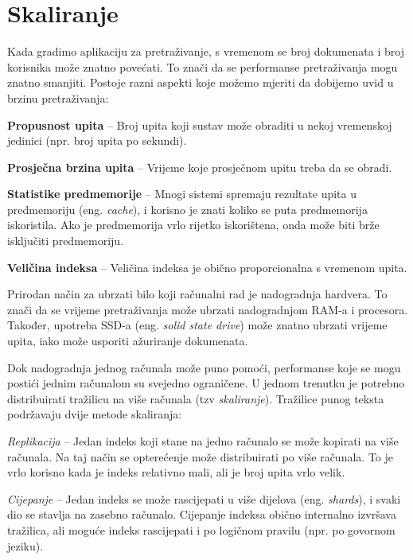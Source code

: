 \documentclass[a4paper,twoside,12pt]{scrreprt}
\begin{document}
\section{Skaliranje}

Kada gradimo aplikaciju za pretraživanje, s vremenom se broj dokumenata i broj korisnika može znatno povećati. To znači da se performanse pretraživanja mogu znatno smanjiti. Postoje razni aspekti koje možemo mjeriti da dobijemo uvid u brzinu pretraživanja:

\begin{compactitem}
  \item \textbf{Propusnost upita} – Broj upita koji sustav može obraditi u nekoj vremenskoj jedinici (npr. broj upita po sekundi).
  \item \textbf{Prosječna brzina upita} – Vrijeme koje prosječnom upitu treba da se obradi.
  \item \textbf{Statistike predmemorije} – Mnogi sistemi spremaju rezultate upita u predmemoriju (eng. \textit{cache}), i korisno je znati koliko se puta predmemorija iskoristila. Ako je predmemorija vrlo rijetko iskorištena, onda može biti brže isključiti predmemoriju.
  \item \textbf{Veličina indeksa} – Veličina indeksa je obično proporcionalna s vremenom upita.
\end{compactitem}

Prirodan način za ubrzati bilo koji računalni rad je nadogradnja hardvera. To znači da se vrijeme pretraživanja može ubrzati nadogradnjom RAM-a i procesora. Također, upotreba SSD-a (eng. \textit{solid state drive}) može znatno ubrzati vrijeme upita, iako može usporiti ažuriranje dokumenata.

Dok nadogradnja jednog računala može puno pomoći, performanse koje se mogu postići jednim računalom su svejedno ograničene. U jednom trenutku je potrebno distribuirati tražilicu na više računala (tzv \textit{skaliranje}). Tražilice punog teksta podržavaju dvije metode skaliranja:

\begin{compactenum}
  \item \textit{Replikacija} – Jedan indeks koji stane na jedno računalo se može kopirati na više računala. Na taj način se opterećenje može distribuirati po više računala. To je vrlo korisno kada je indeks relativno mali, ali je broj upita vrlo velik.
  \item \textit{Cijepanje} – Jedan indeks se može rascijepati u više dijelova (eng. \textit{shards}), i svaki dio se stavlja na zasebno računalo. Cijepanje indeksa obično internalno izvršava tražilica, ali moguće indeks rascijepati i po logičnom pravilu (npr. po govornom jeziku).
\end{compactenum}
\end{document}

